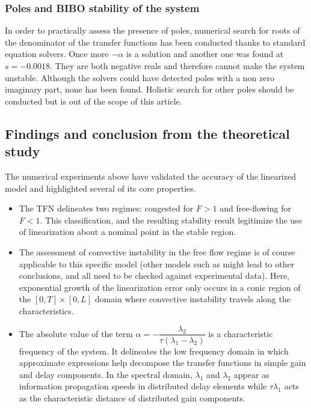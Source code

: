 \documentclass[a4paper, 10pt, conference]{ieeeconf}      %
\begin{document}
\subsubsection{Poles and BIBO stability of the system}
In order to practically assess the presence of poles, numerical search for roots of the denominator of the transfer functions has been conducted thanks to standard equation solvers. Once more $-\alpha$ is a solution and another one was found at $s=-0.0018$. They are both negative reals and therefore cannot make the system unstable. Although the solvers could have detected poles with a non zero imaginary part, none has been found. Holistic search for other poles should be conducted but is out of the scope of this article.

\subsection{Findings and conclusion from the theoretical study}
The numerical experiments above have validated the accuracy of the linearized model and highlighted several of its core properties.
\begin{itemize}
\item The TFN delineates two regimes: congested for $F > 1$ and free-flowing for $F < 1$. This classification, and the resulting stability result legitimize the use of linearization about a nominal point in the stable region.
\item  The assessment of convective instability in the free flow regime is of course applicable to this specific model (other models such as \cite{Jamitons-multi-valued-fund} might lead to other conclusions, and all need to be checked against experimental data). Here, exponential growth of the linearization error only occurs in a conic region of the  $\left[0,T\right] \times \left[0,L\right]$ domain where convective instability travels along the characteristics.
\item The absolute value of the term $\alpha = -\dfrac{\lambda_2}{\tau(\lambda_1 - \lambda_2)}$ is a characteristic frequency of the system. It delineates the low frequency domain in which approximate expressions help decompose the transfer functions in simple gain and delay components. In the spectral domain, $\lambda_{1}$ and $\lambda_{2}$ appear as information propagation speeds in distributed delay elements while  $\tau\lambda_{1}$ acts as the characteristic distance of distributed gain components.
\end{itemize}
\end{document}

